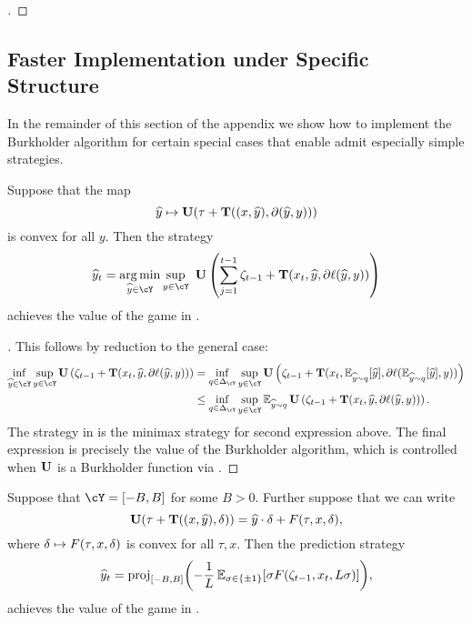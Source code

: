 \begin{proof}[]
\end{proof}

\subsection{Faster Implementation under Specific Structure}

In the remainder of this section of the appendix we show how to implement the Burkholder algorithm for certain special cases that enable admit especially simple strategies.

\begin{lemma}
  \label{lem:det_strat2}
  Suppose that the map
  \[
    {\widehat{y}} \mapsto \mathbf{U}(\tau + \mathbf{T}((x,{\widehat{y}}) , \partial({\widehat{y}}, y)))
  \]
  is convex for all $y$. Then the strategy
\begin{align}
	\label{eq:det_strat2}
  \pred_{t}=\argmin_{\pred\in\cY}\sup_{y\in\cY} ~\burk\left(\sum_{j=1}^{t-1} \zeta_{t-1} + \suff(x_t,\yh,\partial \loss(\pred,y))\right)
\end{align}
achieves the value of the game in .
\end{lemma}
\begin{proof}[]
  This follows by reduction to the general case:
  \begin{align*}
	  \inf_{\pred\in\cY}\sup_{y\in\cY} \burk\left(\zeta_{t-1} + \suff(x_t,\pred,\partial \loss(\pred,y))\right)
    &= \inf_{q\in\Delta_{\cY}}\sup_{y\in\cY} \burk\left(\zeta_{t-1} + \suff(x_t,\En_{\pred\sim{}q}\brk*{\pred},\partial \loss(\En_{\pred\sim{}q}\brk*{\pred},y))\right) \\
    &\leq \inf_{q\in\Delta_{\cY}}\sup_{y\in\cY} \En_{\yh\sim{}q}\burk\left(\zeta_{t-1} + \suff(x_t,\yh,\partial \loss(\yh,y))\right).
  \end{align*}
  The strategy in  is the minimax strategy for second expression above. The final expression is precisely the value of the Burkholder algorithm, which is controlled when $\mathbf{U}$ is a Burkholder function via .
\end{proof}
  
  \begin{lemma}
  \label{lem:det_strat3}
  Suppose that $\cY=\brk*{-B, B}$ for some $B>0$. Further suppose that we can write 
  \[
	\mathbf{U}(\tau + \mathbf{T}((x,{\widehat{y}}) , \delta)) = {\widehat{y}}\cdot\delta + F(\tau, x, \delta),
  \]
  where $\delta\mapsto{}F(\tau, x, \delta)$ is convex for all $\tau,x$.
Then the prediction strategy
  \begin{align}
	\label{eq:det_strat3}
  \pred_{t}= \mathrm{proj}_{\brk*{-B,B}}\prn*{-\frac{1}{L}\En_{\sigma\in\pmo}\brk*{
  \sigma{}F(\zeta_{t-1}, x_{t}, L\sigma)
  }},
  \end{align}
achieves the value of the game in .
\end{lemma}

